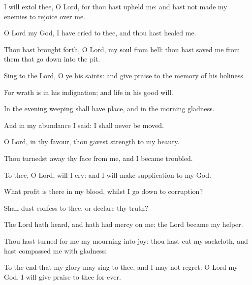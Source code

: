 \item I will extol thee, O Lord, for thou hast upheld me: and hast not made my enemies to rejoice over me.
\item O Lord my God, I have cried to thee, and thou hast healed me.
\item Thou hast brought forth, O Lord, my soul from hell: thou hast saved me from them that go down into the pit.
\item Sing to the Lord, O ye his saints: and give praise to the memory of his holiness.\ifx\enlinebreakafterfour\undefined\else\\\fi
\item For wrath is in his indignation; and life in his good will.
\item In the evening weeping shall have place, and in the morning gladness.
\item And in my abundance I said: I shall never be moved.
\item O Lord, in thy favour, thou gavest strength to my beauty.
\item Thou turnedst away thy face from me, and I became troubled.
\item To thee, O Lord, will I cry: and I will make supplication to my God.
\item What profit is there in my blood, whilst I go down to corruption?
\item Shall dust confess to thee, or declare thy truth?
\item The Lord hath heard, and hath had mercy on me: the Lord became my helper.
\item Thou hast turned for me my mourning into joy: thou hast cut my sackcloth, and hast compassed me with gladness:
\item To the end that my glory may sing to thee, and I may not regret: O Lord my God, I will give praise to thee for ever.
